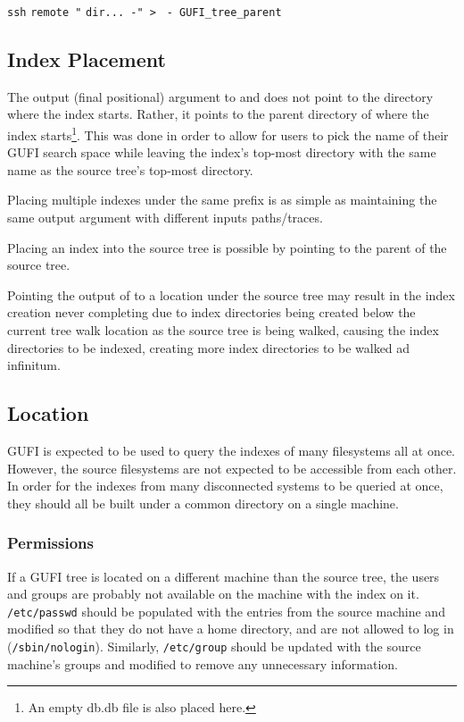 \noindent \texttt{ssh} \texttt{remote "} \gufidirtrace \texttt{dir... -" > } \gufitraceindex \texttt{- GUFI\_tree\_parent}

\subsection{Index Placement}
The output (final positional) argument to \gufidirindex and
\gufitraceindex does not point to the directory where the index
starts. Rather, it points to the parent directory of where the index
starts\footnote{An empty db.db file is also placed here.}. This was
done in order to allow for users to pick the name of their GUFI search
space while leaving the index's top-most directory with the same name
as the source tree's top-most directory.

Placing multiple indexes under the same prefix is as simple as
maintaining the same output argument with different inputs
paths/traces.

Placing an index into the source tree is possible by pointing
\gufidirindex to the parent of the source tree.

Pointing the output of \gufidirindex to a location under the source
tree may result in the index creation never completing due to index
directories being created below the current tree walk location as the
source tree is being walked, causing the index directories to be
indexed, creating more index directories to be walked ad infinitum.




\subsection{Location}
GUFI is expected to be used to query the indexes of many filesystems
all at once. However, the source filesystems are not expected to be
accessible from each other. In order for the indexes from many
disconnected systems to be queried at once, they should all be built
under a common directory on a single machine.

\subsubsection{Permissions}
If a GUFI tree is located on a different machine than the source
tree, the users and groups are probably not available on the machine
with the index on it. \texttt{/etc/passwd} should be populated with
the entries from the source machine and modified so that they do not
have a home directory, and are not allowed to log in
(\texttt{/sbin/nologin}). Similarly, \texttt{/etc/group} should be
updated with the source machine's groups and modified to remove any
unnecessary information.
